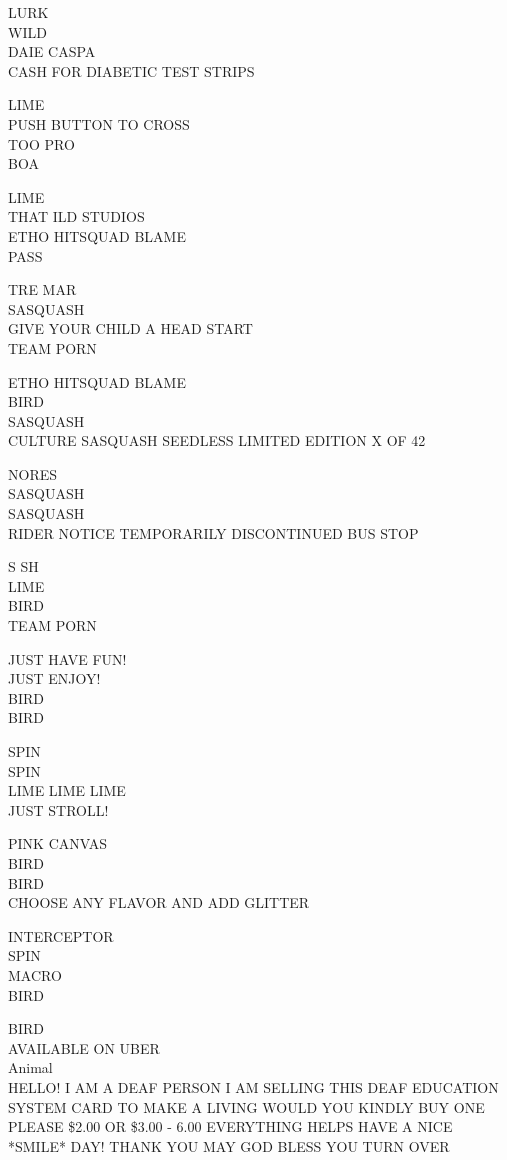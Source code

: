 \documentclass[10pt,letterpaper]{article}
\begin{document}
LURK\\
WILD\\
DAIE CASPA\\
CASH FOR DIABETIC TEST STRIPS

LIME\\
PUSH BUTTON TO CROSS\\
TOO PRO\\
BOA

LIME\\
THAT ILD STUDIOS\\
ETHO HITSQUAD BLAME\\
PASS

TRE MAR\\
SASQUASH\\
GIVE YOUR CHILD A HEAD START\\
TEAM PORN

ETHO HITSQUAD BLAME\\
BIRD\\
SASQUASH\\
CULTURE SASQUASH SEEDLESS LIMITED EDITION X OF 42

NORES\\
SASQUASH\\
SASQUASH\\
RIDER NOTICE TEMPORARILY DISCONTINUED BUS STOP

S SH\\
LIME\\
BIRD\\
TEAM PORN

JUST HAVE FUN!\\
JUST ENJOY!\\
BIRD\\
BIRD

SPIN\\
SPIN\\
LIME LIME LIME\\
JUST STROLL!

PINK CANVAS\\
BIRD\\
BIRD\\
CHOOSE ANY FLAVOR AND ADD GLITTER

INTERCEPTOR\\
SPIN\\
MACRO\\
BIRD

BIRD\\
AVAILABLE ON UBER\\
Animal\\
HELLO!  I AM A DEAF PERSON I AM SELLING THIS DEAF EDUCATION SYSTEM CARD TO MAKE A LIVING WOULD YOU KINDLY BUY ONE PLEASE \$2.00 OR \$3.00 {-} 6.00 EVERYTHING HELPS HAVE A NICE *SMILE* DAY!  THANK YOU MAY GOD BLESS YOU TURN OVER
\end{document}
